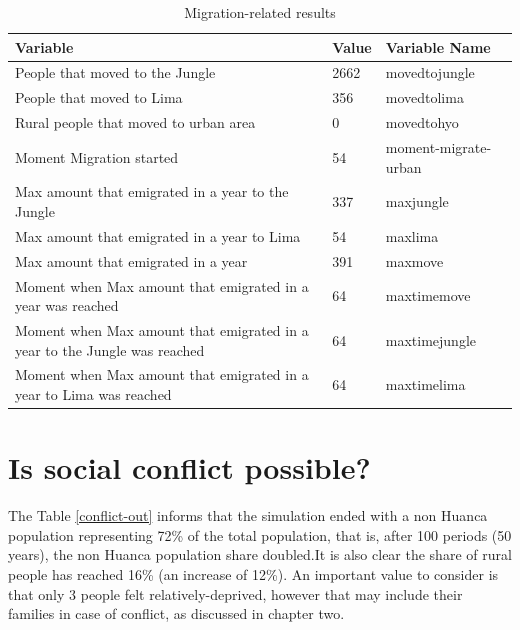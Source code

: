 \documentclass{article}
\begin{document}
\begin{table}[ht]
  \centering
  \caption{Migration-related results}
{\scriptsize
\begin{tabular}{m{2.5in}p{0.5in}p{1.5in}}
  \hline
Variable & Value & Variable Name \\ 
  \hline
People that moved to the Jungle & 2662 & movedtojungle \\ 
  People that moved to Lima & 356 & movedtolima \\ 
  Rural people that moved to urban area &   0 & movedtohyo \\ 
  Moment Migration started &  54 & moment-migrate-urban \\ 
  Max amount that emigrated in a year to the Jungle & 337 & maxjungle \\ 
  Max amount that emigrated in a year to Lima &  54 & maxlima \\ 
  Max amount that emigrated in a year & 391 & maxmove \\ 
  Moment when Max amount that emigrated in a year was reached &  64 & maxtimemove \\ 
  Moment when Max amount that emigrated in a year to the Jungle was reached &  64 & maxtimejungle \\ 
  Moment when Max amount that emigrated in a year to Lima was reached &  64 & maxtimelima \\ 
   \hline
\end{tabular}}
\label{migra-out}
\end{table}


\section {Is social conflict possible?}


The Table \ref{conflict-out} informs that the simulation ended with a non Huanca population representing 72\% of the total population, that is, after 100 periods (50 years), the non Huanca population share doubled.It is also clear the share of rural people has reached 16\% (an increase of 12\%). An important value to consider is that only 3 people felt relatively-deprived, however that may include their families in case of conflict, as discussed in chapter two.
\end{document}
